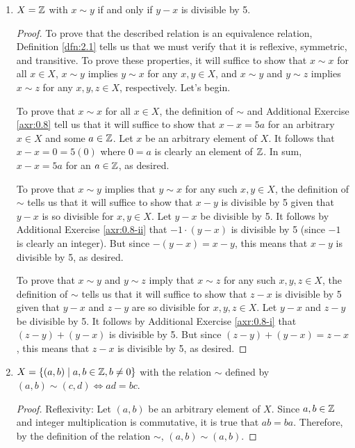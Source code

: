 \documentclass[../main.tex]{subfiles}
\begin{document}
\begin{exercise}
\begin{enumerate}[label={\alph*)},ref={\theexercise\alph*}]
\begin{proof}
        \end{proof}
        \item \label{exr:2.2d}$X=\mathbb{Z}$ with $x\sim y$ if and only if $y-x$ is divisible by 5.
        \begin{proof}
            To prove that the described relation is an equivalence relation, Definition \ref{dfn:2.1} tells us that we must verify that it is reflexive, symmetric, and transitive. To prove these properties, it will suffice to show that $x\sim x$ for all $x\in X$, $x\sim y$ implies $y\sim x$ for any $x,y\in X$, and $x\sim y$ and $y\sim z$ implies $x\sim z$ for any $x,y,z\in X$, respectively. Let's begin.\par
            To prove that $x\sim x$ for all $x\in X$, the definition of $\sim$ and Additional Exercise \ref{axr:0.8} tell us that it will suffice to show that $x-x=5a$ for an arbitrary $x\in X$ and some $a\in\mathbb{Z}$. Let $x$ be an arbitrary element of $X$. It follows that $x-x=0=5(0)$ where $0=a$ is clearly an element of $\mathbb{Z}$. In sum, $x-x=5a$ for an $a\in\mathbb{Z}$, as desired.\par
            To prove that $x\sim y$ implies that $y\sim x$ for any such $x,y\in X$, the definition of $\sim$ tells us that it will suffice to show that $x-y$ is divisible by 5 given that $y-x$ is so divisible for $x,y\in X$. Let $y-x$ be divisible by 5. It follows by Additional Exercise \ref{axr:0.8-ii} that $-1\cdot(y-x)$ is divisible by 5 (since $-1$ is clearly an integer). But since $-(y-x)=x-y$, this means that $x-y$ is divisible by 5, as desired.\par
            To prove that $x\sim y$ and $y\sim z$ imply that $x\sim z$ for any such $x,y,z\in X$, the definition of $\sim$ tells us that it will suffice to show that $z-x$ is divisible by 5 given that $y-x$ and $z-y$ are so divisible for $x,y,z\in X$. Let $y-x$ and $z-y$ be divisible by 5. It follows by Additional Exercise \ref{axr:0.8-i} that $(z-y)+(y-x)$ is divisible by 5. But since $(z-y)+(y-x)=z-x$, this means that $z-x$ is divisible by 5, as desired.
        \end{proof}
        \item \label{exr:2.2e}$X=\{(a,b)\mid a,b\in\mathbb{Z},b\neq 0\}$ with the relation $\sim$ defined by $(a,b)\sim(c,d)\Longleftrightarrow ad=bc$.
        \begin{proof}
            Reflexivity: Let $(a,b)$ be an arbitrary element of $X$. Since $a,b\in\mathbb{Z}$ and integer multiplication is commutative, it is true that $ab=ba$. Therefore, by the definition of the relation $\sim$, $(a,b)\sim(a,b)$.\par

\end{proof}
\end{enumerate}
\end{exercise}
\end{document}
